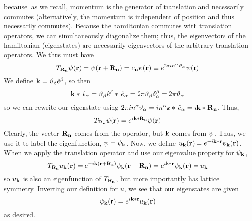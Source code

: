 because, as we recall, momentum is the generator of translation and necessarily commutes (alternatively, the momentum is independent of position and thus necessarily commutes). Because the hamiltonian commutes with translation operators, we can simultaneously diagonalize them; thus, the eigenvectors of the hamiltonian (eigenstates) are necessarily eigenvectors of the arbitrary translation operators. We thus must have
\[T_{\mathbf{R}_{\mathbf{n}}}\psi(\mathbf{r}) = \psi(\mathbf{r}+\mathbf{R}_{\mathbf{n}}) = c_{\mathbf{n}}\psi(\mathbf{r}) \equiv e^{2\pi i n^\alpha\vartheta_\alpha}\psi(\mathbf{r})\]
We define \(\mathbf{k} = \vartheta_\beta \hat e^{\beta}\), so then 
\[\mathbf{k} * \,\hat{e}_{\alpha} = \vartheta_\beta \hat e^{\beta}*\,\hat{e}_{\alpha} = 2\pi \vartheta_\beta \delta_\alpha^\beta = 2\pi\vartheta_\alpha\]
so we can rewrite our eigenstate using \(2\pi i n^\alpha \vartheta_\alpha = in^\alpha k*\,\hat{e}_{\alpha} = i\mathbf{k}*\mathbf{R}_{\mathbf{n}}\). Thus,
\[T_{\mathbf{R}_{\mathbf{n}}} \psi(\mathbf{r}) = e^{i \mathbf{k}*\mathbf{R}_{\mathbf{n}}} \psi(\mathbf{r})\]
Clearly, the vector \(\mathbf{R}_{\mathbf{n}}\) comes from the operator, but \(\mathbf{k}\) comes from \(\psi\). Thus, we use it to label the eigenfunction, \(\psi = \psi_{\mathbf{k}}\). Now, we define \(u_{\mathbf{k}} (\mathbf{r}) = e^{-i\mathbf{k} *\mathbf{r}}\psi_{\mathbf{k}}(\mathbf{r})\). When we apply the translation operator and use our eigenvalue property for \(\psi_{\mathbf{k}}\),
\[T_{\mathbf{R}_{\mathbf{n}}}u_{\mathbf{k}}(\mathbf{r}) = e^{-i\mathbf{k}(\mathbf{r}+\mathbf{R}_{\mathbf{n}})}\psi_{\mathbf{k}}(\mathbf{r}+\mathbf{R}_{\mathbf{n}}) = e^{i\mathbf{k}*\mathbf{r}}\psi_{\mathbf{k}}(\mathbf{r}) = u_{\mathbf{k}}\]
so \(u_{\mathbf{k}}\) is also an eigenfunction of \(T_{\mathbf{R}_{\mathbf{n}}}\), but more importantly has lattice symmetry. Inverting our definition for \(u\), we see that our eigenstates are given
\[\psi_{\mathbf{k}}(\mathbf{r}) = e^{i\mathbf{k}*\mathbf{r}}u_{\mathbf{k}}(\mathbf{r})\]
as desired.

